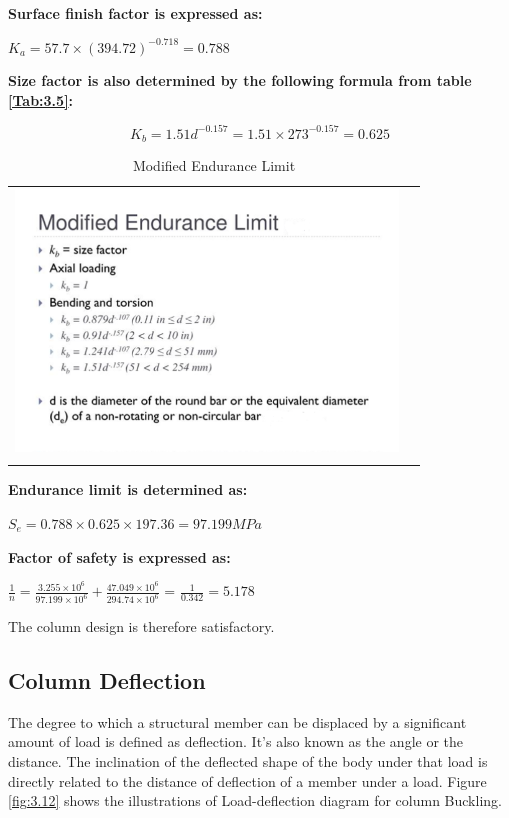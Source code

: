 {\textbf{Surface finish factor is expressed as:}
\begin{center}
    \(K_a = 57.7 \times {({394}.{72})}^{-{0.718}} = 0.788\)
\end{center}

    
\textbf{Size factor is also determined by the following formula from table \ref{Tab:3.5}:}

\begin{equation}
    K_b={1.51}d^{-0.157} = 1.51 \times 273^{-0.157} = 0.625
\end{equation}
  

\begin{table}[htp]
\caption{Modified Endurance Limit}
\centering
\begin{tabular}{c r} 
\includegraphics[width=4in]{Figures/Endurance_Limit.png} \label{Tab:3.5}\\
\cite{ncsu_2014}
\end{tabular}
\label{tab:hresult}
\end{table}




\textbf{Endurance limit is determined as:}
\begin{center}
     \(S_e = 0.788 \times 0.625 \times 197.36 = 97.199MPa\)
\end{center}

\textbf{ Factor of safety is expressed as: }

\begin{center}
    \(\frac{1}{n} = \frac{{3}.{255}\times{{10}}^{6}}{{97}.{199}\times{{10}}^{6}} + \frac{{47.049}\times{{10}}^{6}}{{294}.{74}\times{{10}}^{6}}\)  
\vspace{1cm} =  \(\frac{1}{0.342} = 5.178\)
\end{center}
The column design is therefore satisfactory.

\subsection{Column Deflection}
The degree to which a structural member can be displaced by a significant amount of load is defined as deflection. It's also known as the angle or the distance. The inclination of the deflected shape of the body under that load is directly related to the distance of deflection of a member under a load. Figure \ref{fig:3.12} shows the illustrations of Load-deflection diagram for column Buckling.

}
